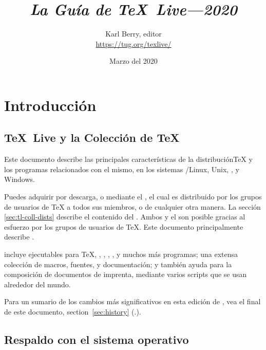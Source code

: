 \documentclass{article}
\begin{document}
\title{%
{\huge \textit{La Guía de \TeX\ Live---2020}}}

\author{Karl Berry, editor \\[3mm]
        \url{https://tug.org/texlive/}}

\date{Marzo del 2020}

\maketitle

\begin{multicols}{2}
\tableofcontents
\end{multicols}

\section{Introducción}
\label{sec:intro}

\subsection{\TeX\ Live y la Colección de \TeX\ }


Este documento describe las principales características de la
distribución\Dash \TeX{} y los programas relacionados con el mismo, en
los sistemas \GNU/Linux, Unix, \MacOSX, y Windows.

Puedes adquirir \TL{} por descarga, o mediante el \TK{} \DVD, el
cual es distribuido por los grupos de usuarios de \TeX{} a todos sus
miembros, o de cualquier otra manera. La sección
\ref{sec:tl-coll-dists} describe el contenido del \DVD. Ambos \TL{} y
el \TK{} son posible gracias al esfuerzo por los grupos de usuarios de
\TeX{}. Este documento principalmente describe \TL{}.

\TL{} incluye ejecutables para \TeX{}, \LaTeXe{}, \ConTeXt, \MF, \MP,
\BibTeX{} y muchos más programas; una extensa colección de macros,
fuentes, y documentación; y también ayuda para la composición de
documentos de imprenta, mediante varios scripts que se usan alrededor
del mundo.

Para un sumario de los cambios más significativos en esta edición de
\TL{}, vea el final de este documento, section~\ref{sec:history}
(\p.\pageref{sec:history}).

\subsection{Respaldo con el sistema operativo}
\label{sec:os-support}
\end{document}
